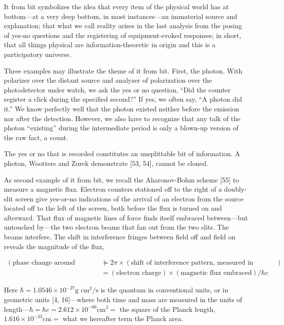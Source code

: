 \documentclass[11pt]{article}
\begin{document}
	It from bit symbolizes the idea that every item of the physical world has at
	bottom---at a very deep bottom, in most instances---an immaterial source and
	explanation; that what we call reality arises in the last analysis from the posing of
	yes-no questions and the registering of equipment-evoked responses; in short, that
	all things physical are information-theoretic in origin and this is a participatory
	universe.
	
	Three examples may illustrate the theme of it from bit. First, the photon. With
	polarizer over the distant source and analyzer of polarization over the photodetector
	under watch, we ask the yes or no question, ``Did the counter register a click during
	the specified second?'' If yes, we often say, ``A photon did it.'' We know perfectly
	well that the photon existed neither before the emission nor after the detection.
	However, we also have to recognize that any talk of the photon ``existing'' during
	the intermediate period is only a blown-up version of the raw fact, a count.
	
	The yes or no that is recorded constitutes an unsplittable bit of information. A
	photon, Wootters and Zurek demonstrate [53, 54], cannot be cloned.
	
	As second example of it from bit, we recall the Aharonov-Bohm scheme [55] to
	measure a magnetic flux. Electron counters stationed off to the right of a doubly-
	slit screen give yes-or-no indications of the arrival of an electron from the source
	located off to the left of the screen, both before the flux is turned on and afterward.
	That flux of magnetic lines of force finds itself embraced between---but untouched
	by---the two electron beams that fan out from the two slits. The beams interfere.
	The shift in interference fringes between field off and field on reveals the magnitude
	of the flux,
	
	\begin{align*}
		(\text{phase change around perimeter of the included area}) &= 2\pi \times (\text{shift of interference pattern, measured in number of fringes}) \\
		&= (\text{electron charge}) \times (\text{magnetic flux embraced}) / \hbar c
		\tag{19.1}
	\end{align*}
	
	Here $\hbar = 1.0546 \times 10^{-27} \text{g cm}^2/\text{s}$ is the quantum in conventional units, or in geometric units [4, 16]---where both time and mass are measured in the units of length---$\hbar = \hbar c = 2.612 \times 10^{-66} \text{cm}^2 =$ the square of the Planck length, $1.616 \times 10^{-33} \text{cm} =$ what we hereafter term the Planck area.
	
\end{document}
